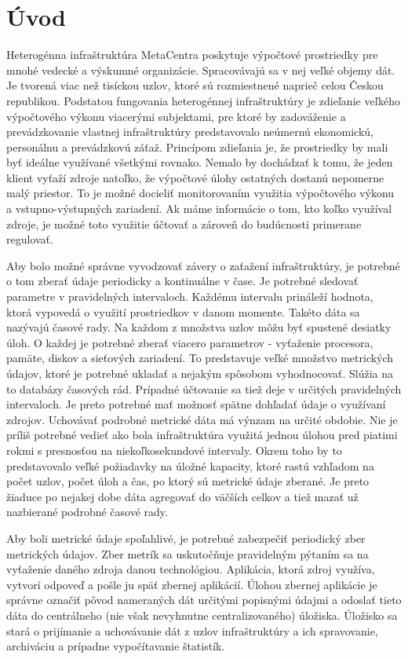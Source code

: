 \documentclass[12pt,twoside,color,cover,table]{fithesis3}
\begin{document}
\chapter{Úvod}
Heterogénna infraštruktúra MetaCentra poskytuje výpočtové prostriedky pre mnohé vedecké a výskumné organizácie. Spracovávajú sa v nej veľké objemy dát. Je tvorená viac než tisíckou uzlov, ktoré sú
rozmiestnené naprieč celou
Českou republikou. Podstatou fungovania heterogénnej infraštruktúry je zdieľanie veľkého výpočtového výkonu viacerými subjektami, pre ktoré by zadováženie a prevádzkovanie vlastnej infraštruktúry predstavovalo neúmernú 
ekonomickú, personálnu a prevádzkovú záťaž. Princípom zdieľania je, že prostriedky by mali byť ideálne využívané všetkými rovnako. Nemalo by dochádzať k tomu, že jeden klient vyťaží zdroje natoľko, že 
výpočtové úlohy ostatných dostanú nepomerne malý priestor. To je možné docieliť monitorovaním využitia výpočtového výkonu a vstupno-výstupných zariadení. Ak máme informácie o tom, kto koľko využíval zdroje, 
je možné toto využitie účtovať a zároveň do budúcnosti primerane regulovať. 

Aby bolo možné správne vyvodzovať závery o zaťažení infraštruktúry, je potrebné o tom zberať údaje periodicky a kontinuálne v čase. Je potrebné sledovať parametre v pravidelných intervaloch. Každému intervalu 
prináleží hodnota, ktorá vypovedá o využití prostriedkov v danom momente. Takéto dáta sa nazývajú časové rady. Na každom z množstva uzlov môžu byť spustené desiatky úloh. O každej je
potrebné zberať viacero parametrov - vyťaženie procesora, pamäte, diskov a sieťových zariadení. To predstavuje veľké množstvo metrických údajov, ktoré je potrebné ukladať a nejakým spôsobom vyhodnocovať. 
Slúžia na to 
databázy časových rád. Prípadné účtovanie sa tiež deje v určitých pravidelných intervaloch. Je preto potrebné mať možnosť spätne dohľadať údaje o využívaní zdrojov. Uchovávať podrobné metrické dáta má výnzam na určité
obdobie. Nie je príliš potrebné vedieť ako bola infraštruktúra využitá jednou úlohou pred piatimi rokmi s presnosťou na niekoľkosekundové intervaly. Okrem toho by to predstavovalo veľké požiadavky na úložné kapacity, 
ktoré rastú vzhľadom na počet uzlov, počet úloh a čas, po ktorý sú metrické údaje zberané. Je preto žiaduce po nejakej dobe dáta agregovať do väčších celkov a tiež mazať už nazbierané podrobné časové rady.

Aby boli metrické údaje spoľahlivé, je potrebné zabezpečiť periodický zber metrických údajov. Zber metrík sa uskutočňuje pravidelným pýtaním sa na vyťaženie daného zdroja danou technológiou. 
Aplikácia, ktorá zdroj využíva, vytvorí odpoveď a pošle ju späť zbernej aplikácií. Úlohou zbernej aplikácie je správne označiť pôvod nameraných dát určitými popisnými údajmi a odoslať tieto dáta
do centrálneho (nie však nevyhnutne centralizovaného) úložiska. Úložisko sa stará o prijímanie a uchovávanie dát z uzlov infraštruktúry a ich spravovanie, archiváciu a prípadne vypočítavanie štatistík.
\end{document}
